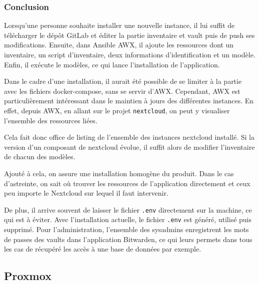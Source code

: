 \documentclass[12pt]{article}
\begin{document}
\subsubsection{Conclusion}
Lorsqu'une personne souhaite installer une nouvelle instance, il lui suffit de télécharger le dépôt GitLab et éditer la partie inventaire et vault puis de push ses modifications. 
Ensuite, dans Ansible AWX, il ajoute les ressources dont un inventaire, un script d'inventaire, deux informations d'identification et un modèle. 
Enfin, il exécute le modèles, ce qui lance l'installation de l'application.

Dans le cadre d'une installation, il aurait été possible de se limiter à la partie avec les fichiers docker-compose, sans se servir d'AWX. 
Cependant, AWX est particulièrement intéressant dans le maintien à jours des différentes instances. 
En effet, depuis AWX, en allant sur le projet \verb|nextcloud|, on peut y visualiser l'ensemble des ressources liées.

Cela fait donc office de listing de l'ensemble des instances nextcloud installé. 
Si la version d'un composant de nextcloud évolue, il suffit alors de modifier l'inventaire de chacun des modèles.

Ajouté à cela, on assure une installation homogène du produit. 
Dans le cas d'astreinte, on sait où trouver les ressources de l'application directement et ceux peu importe le Nextcloud sur lequel il faut intervenir.

De plus, il arrive souvent de laisser le fichier \verb|.env| directement sur la machine, ce qui est à éviter. 
Avec l'installation actuelle, le fichier \verb|.env| est généré, utilisé puis supprimé. 
Pour l'administration, l'ensemble des sysadmins enregistrent les mots de passes des vaults dans l'application Bitwarden, ce qui leurs permets dans tous les cas de récupéré les accès à une base de données par exemple.

\newpage
\subsection{Proxmox}
\end{document}
